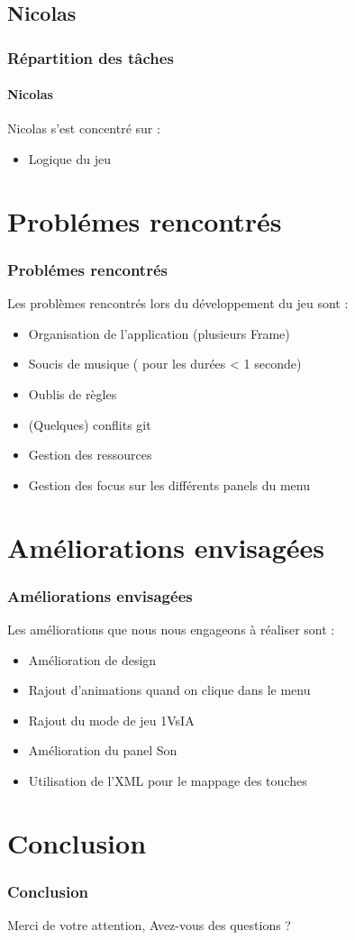 \documentclass[handout]{beamer}
\begin{document}
\subsection{Nicolas}
\begin{frame}[label=Nicolas]
\frametitle{R\'epartition des t\^{a}ches}
\framesubtitle{Nicolas}
Nicolas s'est concentr\'e sur :
\begin{itemize}
\item Logique du jeu
\end{itemize}
\end{frame}

\section{Probl\'emes rencontr\'es}
\begin{frame}[label=probl\'emes rencontr\'es]
\frametitle{Probl\'emes rencontr\'es}
Les probl\`emes rencontr\'es lors du d\'eveloppement du jeu sont : 
\begin{itemize}
\item Organisation de l'application (plusieurs Frame)
\item Soucis de musique ( pour les dur\'ees < 1 seconde)
\item Oublis de r\`egles
\item (Quelques) conflits git
\item Gestion des ressources
\item Gestion des focus sur les diff\'erents panels du menu
\end{itemize}
\end{frame}

\section{Am\'eliorations envisag\'ees}
\begin{frame}[label=Am\'eliorations envisag\'ees]
\frametitle{Am\'eliorations envisag\'ees}
Les am\'eliorations que nous nous engageons \`a r\'ealiser sont : 
\begin{itemize}
\item Am\'elioration de design
\item Rajout d'animations quand on clique dans le menu
\item Rajout du mode de jeu 1VsIA
\item Am\'elioration du panel Son
\item Utilisation de l'XML pour le mappage des touches
\end{itemize}
\end{frame}

\section{Conclusion}
\begin{frame}[label=pagebanale]
\frametitle{Conclusion}
Merci de votre attention,\smallbreak
Avez-vous des questions ? 
\end{frame}
\end{document}
